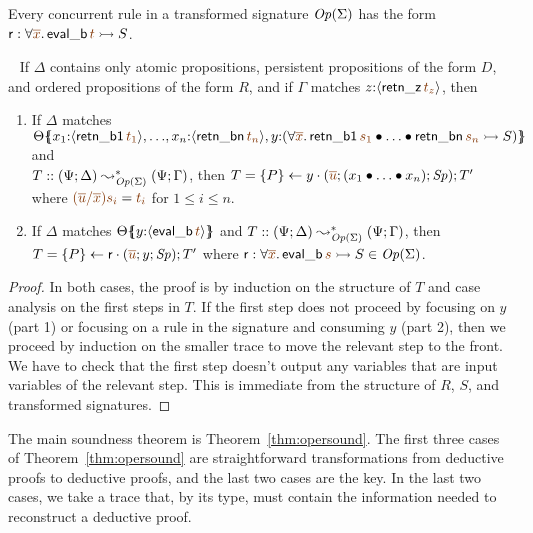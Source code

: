 \noindent
Every concurrent rule in a transformed signature
${\it Op}({\Sigma})$ has the form ${\sf r} : \forall \lf{\overline{x}}.\,
{\sf eval\_b}\,\lf{t} \lefti S$. 



\bigskip
\begin{theorem}[Rearrangement]\label{thm:rearrangement}~
If $\Delta$ contains only atomic propositions, persistent propositions
of the form $D$, and ordered 
propositions of the form $R$, and if $\Gamma$ matches
$z{:}\susp{{\sf retn\_z}\,\lf{t_z}}$, 
then 
\begin{enumerate}
\item If $\Delta$ matches \\
$\frameoff{\Theta}
 {\matchconj
  {x_1{:}\susp{{\sf retn\_b1}\,\lf{t_1}}}
  {\matchconj
    {\ldots}
    {\matchconj 
      {x_n{:}\susp{{\sf retn\_bn}\,\lf{t_n}}}
      {y{:}{(\forall \lf{\overline{x}}.\,{\sf retn\_b1}\,\lf{s_1} \fuse \ldots \fuse {\sf retn\_bn}\,\lf{s_n} \lefti S)}}}}}$ and \\
$T :: (\Psi; \Delta) \leadsto^*_{{\it Op}({\Sigma})}
(\Psi; \Gamma)$, then 
$T = \tstep{P}{y}{(\lf{\overline{u}}; (\tfuser{x_1}{\tfuser{\ldots}{x_n}}); \Sp)}; T'$
where $\lf{(\overline{u}/\overline{x})s_i} = \lf{t_i}$ for $1 \leq i \leq n$.
\item If $\Delta$ matches
$\frameoff{\Theta}
 {y{:}\susp{{\sf eval\_b}\,\lf{t}}}$ and 
$T :: (\Psi; \Delta) \leadsto^*_{{\it Op}({\Sigma})}
(\Psi; \Gamma)$, 
then 
$T = \tstep{P}{\sf r}{(\lf{\overline{u}}; y; \Sp)}; T'$
where 
${\sf r} : \forall \lf{\overline{x}}.\,{\sf eval\_b}\,\lf{s} \lefti S 
\in \transop{\Sigma}$.
\end{enumerate}
\end{theorem}

\begin{proof}
In both cases, the proof is by
induction on the structure of $T$ and case analysis on the first
steps in $T$. 
%
If the first step does not proceed by focusing on $y$ (part 1) or
focusing on a rule in the signature and consuming $y$ (part 2), then
we proceed by induction on the smaller trace to move the relevant step
to the front. We have to check that the first step doesn't output any
variables that are input variables of the relevant step.  This is
immediate from the structure of $R$, $S$, and transformed signatures.
\end{proof}

The main soundness theorem is Theorem~\ref{thm:opersound}. The first
three cases of Theorem~\ref{thm:opersound} are straightforward 
transformations from deductive proofs to deductive proofs, and the last
two cases are the key. In the last two cases, we take a trace that, by
its type, must contain the information needed to 
reconstruct a deductive proof.

